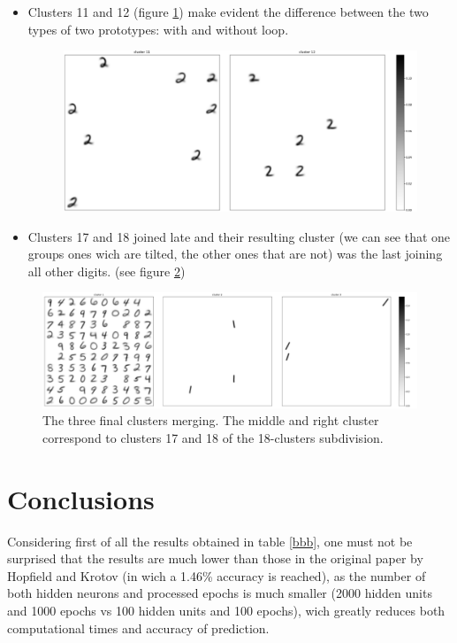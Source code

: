 \documentclass[a4paper]{report}
\begin{document}
\begin{itemize}
    \item Clusters 11 and 12 (figure \ref{1112}) make evident the difference between the two types of two prototypes: with and without loop.
    
\begin{figure} [H]
    \centering
    \includegraphics [width=\textwidth ] {c/h/11.png}
    \caption{}
    \label{1112}
\end{figure}
    
    \item Clusters 17 and 18 joined late and their resulting cluster (we can see that one groups ones wich are tilted, the other ones that are not) was the last joining all other digits. (see figure \ref{final})
\end{itemize}

\begin{figure} [H]
    \centering
    \includegraphics  [width=\textwidth]  {c/h/final1.png}
    \caption{The three final clusters merging. The middle and right cluster correspond to clusters 17 and 18 of the 18-clusters subdivision.}
    \label{final}
\end{figure}

\chapter{Conclusions}

Considering first of all the results obtained in table \ref{bbb}, one must not be surprised that the results are much lower than those in the original paper by Hopfield and Krotov (in wich a 1.46\% accuracy is reached), as the number of both hidden neurons and processed epochs is much smaller (2000 hidden units and 1000 epochs vs 100 hidden units and 100 epochs), wich greatly reduces both computational times and accuracy of prediction.
\end{document}
